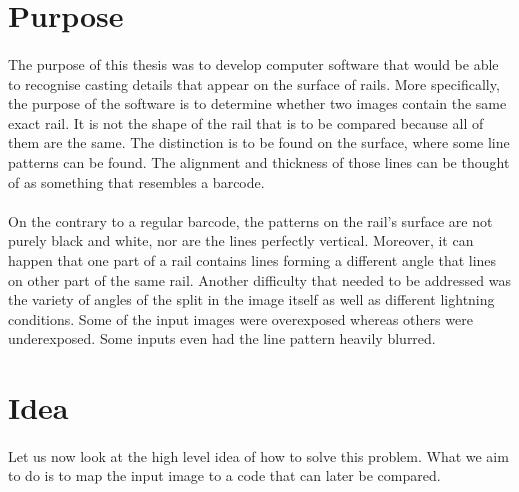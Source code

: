 \section{Purpose}
\paragraph{}
The purpose of this thesis was to develop computer software that would be able to recognise casting details that appear on the surface of rails. More specifically, the purpose of the software is to determine whether two images contain the same exact rail. It is not the shape of the rail that is to be compared because all of them are the same. The distinction is to be found on the surface, where some line patterns can be found. The alignment and thickness of those lines can be thought of as something that resembles a barcode. 
\paragraph{}
On the contrary to a regular barcode, the patterns on the rail's surface are not purely black and white, nor are the lines perfectly vertical. Moreover, it can happen that one part of a rail contains lines forming a different angle that lines on other part of the same rail. Another difficulty that needed to be addressed was the variety of angles of the split in the image itself as well as different lightning conditions. Some of the input images were overexposed whereas others were underexposed. Some inputs even had the line pattern heavily blurred. 

\section{Idea}
\paragraph{}
Let us now look at the high level idea of how to solve this problem. What we aim to do is to map the input image to a code that can later be compared.
